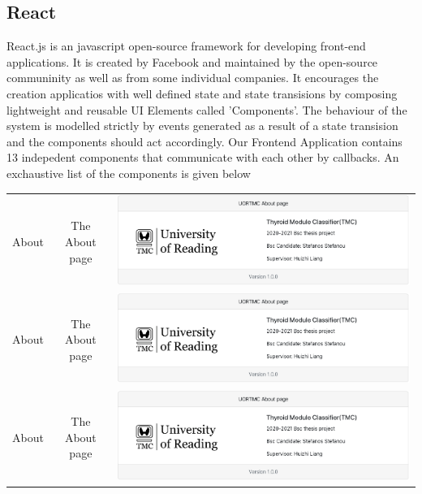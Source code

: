 		\subsection{React}
			React.js is an javascript open-source framework for developing front-end applications. It is created by Facebook and 
			maintained by the open-source communinity as well as from some individual companies. It encourages the creation applicatios
			with well defined state and state transisions by composing lightweight and reusable UI Elements called 'Components'. The
			behaviour of the system is modelled strictly by events generated as a result of a state transision and the components should
			act accordingly. Our Frontend Application contains 13 indepedent components that communicate with each other by callbacks.
			An exchaustive list of the components is given below
			\begin{center}
				\begin{tabular}{ |c|c|c| } 
					\hline
					About & The About page &\includegraphics[scale=0.2]{figures/component-about}\\
					About & The About page &\includegraphics[scale=0.2]{figures/component-about}\\
					About & The About page &\includegraphics[scale=0.2]{figures/component-about}\\

\end{tabular}
\end{center}
